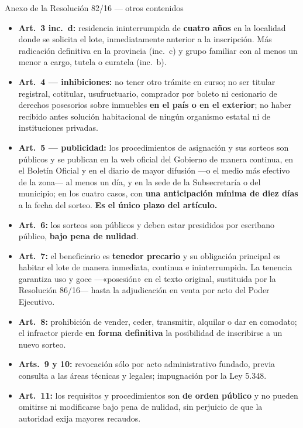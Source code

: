 \begin{ficha}{Anexo de la Resolución 82/16 --- otros contenidos}
\begin{itemize}[leftmargin=*,nosep]
\item \textbf{Art.\ 3 inc.\ d:} residencia ininterrumpida de \textbf{cuatro años} en la localidad donde se solicita el lote, inmediatamente anterior a la inscripción. Más radicación definitiva en la provincia (inc.\ c) y grupo familiar con al menos un menor a cargo, tutela o curatela (inc.\ b).
\item \textbf{Art.\ 4 --- inhibiciones:} no tener otro trámite en curso; no ser titular registral, cotitular, usufructuario, comprador por boleto ni cesionario de derechos posesorios sobre inmuebles \textbf{en el país o en el exterior}; no haber recibido antes solución habitacional de ningún organismo estatal ni de instituciones privadas.
\item \textbf{Art.\ 5 --- publicidad:} los procedimientos de asignación y sus sorteos son públicos y se publican en la web oficial del Gobierno de manera continua, en el Boletín Oficial y en el diario de mayor difusión ---o el medio más efectivo de la zona--- al menos un día, y en la sede de la Subsecretaría o del municipio; en los cuatro casos, con \textbf{una anticipación mínima de diez días} a la fecha del sorteo. \textbf{Es el único plazo del artículo.}
\item \textbf{Art.\ 6:} los sorteos son públicos y deben estar presididos por escribano público, \textbf{bajo pena de nulidad}.
\item \textbf{Art.\ 7:} el beneficiario es \textbf{tenedor precario} y su obligación principal es habitar el lote de manera inmediata, continua e ininterrumpida. La tenencia garantiza uso y goce ---«posesión» en el texto original, sustituida por la Resolución 86/16--- hasta la adjudicación en venta por acto del Poder Ejecutivo.
\item \textbf{Art.\ 8:} prohibición de vender, ceder, transmitir, alquilar o dar en comodato; el infractor pierde \textbf{en forma definitiva} la posibilidad de inscribirse a un nuevo sorteo.
\item \textbf{Arts.\ 9 y 10:} revocación sólo por acto administrativo fundado, previa consulta a las áreas técnicas y legales; impugnación por la Ley 5.348.
\item \textbf{Art.\ 11:} los requisitos y procedimientos son \textbf{de orden público} y no pueden omitirse ni modificarse bajo pena de nulidad, sin perjuicio de que la autoridad exija mayores recaudos.
\end{itemize}
\end{ficha}

